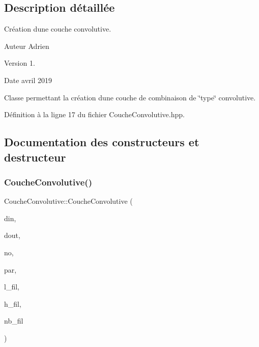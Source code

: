 \subsection{Description détaillée}
Création d\textquotesingle{}une couche convolutive. 

\begin{DoxyAuthor}{Auteur}
Adrien 
\end{DoxyAuthor}
\begin{DoxyVersion}{Version}
1. 
\end{DoxyVersion}
\begin{DoxyDate}{Date}
avril 2019
\end{DoxyDate}
Classe permettant la création d\textquotesingle{}une couche de combinaison de \char`\"{}type\char`\"{} convolutive. 

Définition à la ligne 17 du fichier Couche\+Convolutive.\+hpp.



\subsection{Documentation des constructeurs et destructeur}
\mbox{\label{class_couche_convolutive_ac0e9fc1269646ff46ab9ea2a26489123}} 
\subsubsection{\texorpdfstring{Couche\+Convolutive()}{CoucheConvolutive()}}
{\footnotesize\ttfamily Couche\+Convolutive\+::\+Couche\+Convolutive (\begin{DoxyParamCaption}\item[{\hyperlink{class_dim_tenseur}{Dim\+Tenseur}}]{din,  }\item[{\hyperlink{class_dim_tenseur}{Dim\+Tenseur}}]{dout,  }\item[{std\+::string}]{no,  }\item[{\hyperlink{class_tenseur}{Tenseur}}]{par,  }\item[{int}]{l\+\_\+fil,  }\item[{int}]{h\+\_\+fil,  }\item[{int}]{nb\+\_\+fil }\end{DoxyParamCaption})}



